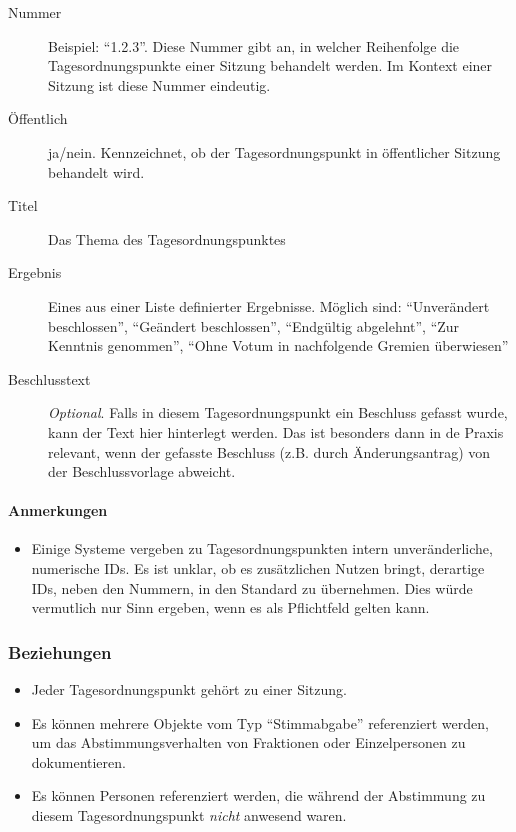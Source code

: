 \documentclass[,a4paper]{article}
\begin{document}
\begin{description}
\item[Nummer]
Beispiel: ``1.2.3''. Diese Nummer gibt an, in welcher Reihenfolge die
Tagesordnungspunkte einer Sitzung behandelt werden. Im Kontext einer
Sitzung ist diese Nummer eindeutig.
\item[Öffentlich]
ja/nein. Kennzeichnet, ob der Tagesordnungspunkt in öffentlicher Sitzung
behandelt wird.
\item[Titel]
Das Thema des Tagesordnungspunktes
\item[Ergebnis]
Eines aus einer Liste definierter Ergebnisse. Möglich sind:
``Unverändert beschlossen'', ``Geändert beschlossen'', ``Endgültig
abgelehnt'', ``Zur Kenntnis genommen'', ``Ohne Votum in nachfolgende
Gremien überwiesen''
\item[Beschlusstext]
\emph{Optional}. Falls in diesem Tagesordnungspunkt ein Beschluss
gefasst wurde, kann der Text hier hinterlegt werden. Das ist besonders
dann in de Praxis relevant, wenn der gefasste Beschluss (z.B. durch
Änderungsantrag) von der Beschlussvorlage abweicht.
\end{description}

\paragraph{Anmerkungen}

\begin{itemize}
\item
  Einige Systeme vergeben zu Tagesordnungspunkten intern
  unveränderliche, numerische IDs. Es ist unklar, ob es zusätzlichen
  Nutzen bringt, derartige IDs, neben den Nummern, in den Standard zu
  übernehmen. Dies würde vermutlich nur Sinn ergeben, wenn es als
  Pflichtfeld gelten kann.
\end{itemize}

\subsubsection{Beziehungen}

\begin{itemize}
\item
  Jeder Tagesordnungspunkt gehört zu einer Sitzung.
\item
  Es können mehrere Objekte vom Typ ``Stimmabgabe'' referenziert werden,
  um das Abstimmungsverhalten von Fraktionen oder Einzelpersonen zu
  dokumentieren.
\item
  Es können Personen referenziert werden, die während der Abstimmung zu
  diesem Tagesordnungspunkt \emph{nicht} anwesend waren.
\end{itemize}
\end{document}
